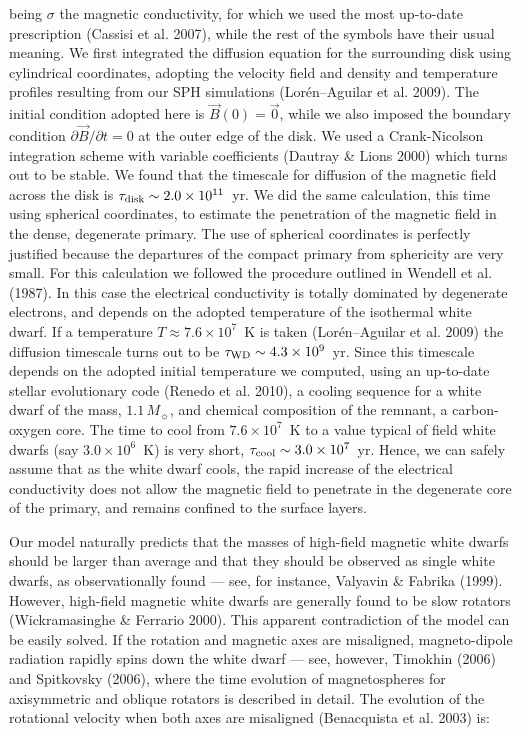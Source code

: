 \documentclass[]{emulateapj}
\begin{document}
\noindent being $\sigma$ the  magnetic conductivity, for which we used
the most up-to-date prescription (Cassisi et al. 2007), while the rest
of  the symbols  have their  usual meaning.   We first  integrated the
diffusion  equation   for  the  surrounding   disk  using  cylindrical
coordinates, adopting  the velocity field and  density and temperature
profiles  resulting  from  our  SPH simulations  (Lor\'en--Aguilar  et
al. 2009). The initial condition adopted here is $\vec{B}(0)=\vec{0}$,
while we also imposed the boundary condition $\partial\vec{B}/\partial
t=0$  at  the  outer edge  of  the  disk.   We used  a  Crank-Nicolson
integration scheme with variable  coefficients (Dautray \& Lions 2000)
which  turns  out  to be  stable.  We  found  that the  timescale  for
diffusion  of  the  magnetic  field  across  the  disk  is  $\tau_{\rm
disk}\sim 2.0\times  10^{11}$~yr.  We  did the same  calculation, this
time using  spherical coordinates, to estimate the  penetration of the
magnetic field in the dense, degenerate primary.  The use of spherical
coordinates  is  perfectly justified  because  the  departures of  the
compact primary from sphericity  are very small.  For this calculation
we followed the procedure outlined in Wendell et al.  (1987).  In this
case the  electrical conductivity  is totally dominated  by degenerate
electrons, and  depends on the  adopted temperature of  the isothermal
white dwarf.   If a temperature  $T\approx 7.6\times 10^7$~K  is taken
(Lor\'en--Aguilar et  al.  2009) the diffusion timescale  turns out to
be  $\tau_{\rm  WD}\sim  4.3\times  10^9$~yr.   Since  this  timescale
depends  on the  adopted  initial temperature  we  computed, using  an
up-to-date stellar evolutionary code  (Renedo et al.  2010), a cooling
sequence for a white dwarf of the mass, $1.1\, M_{\sun}$, and chemical
composition of  the remnant, a  carbon-oxygen core.  The time  to cool
from $7.6\times 10^7$~K to a  value typical of field white dwarfs (say
$3.0\times  10^6$~K)  is very  short,  $\tau_{\rm cool}\sim  3.0\times
10^7$~yr. Hence, we  can safely assume that as  the white dwarf cools,
the rapid increase  of the electrical conductivity does  not allow the
magnetic field to penetrate in the degenerate core of the primary, and
remains confined to the surface layers.

Our model  naturally predicts that  the masses of  high-field magnetic
white dwarfs  should be  larger than average  and that they  should be
observed as single white dwarfs, as observationally found --- see, for
instance,  Valyavin \&  Fabrika (1999).  However,  high-field magnetic
white dwarfs  are generally found to be  slow rotators (Wickramasinghe
\& Ferrario  2000).  This apparent  contradiction of the model  can be
easily  solved.  If  the rotation  and magnetic  axes  are misaligned,
magneto-dipole radiation  rapidly spins down the white  dwarf --- see,
however,  Timokhin  (2006)  and  Spitkovsky  (2006),  where  the  time
evolution of  magnetospheres for axisymmetric and  oblique rotators is
described in  detail.  The evolution  of the rotational  velocity when
both axes are misaligned (Benacquista et al. 2003) is:
\end{document}
